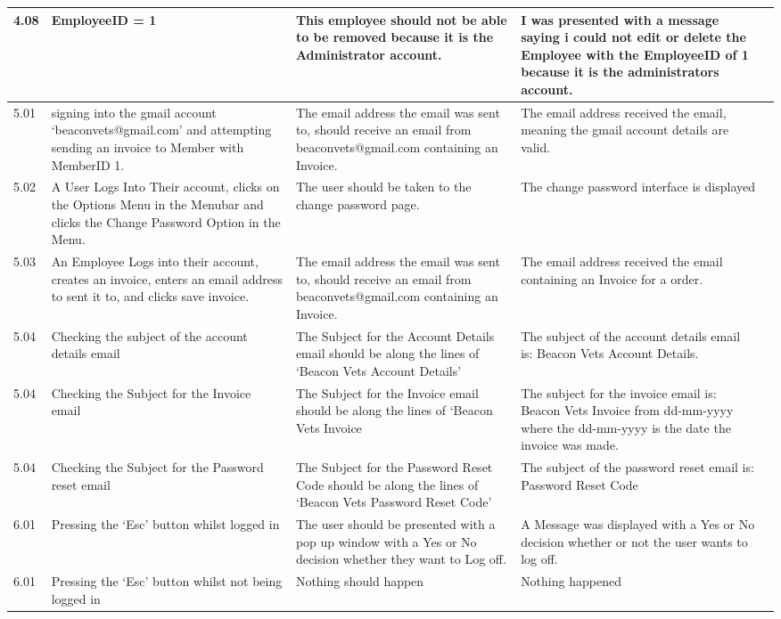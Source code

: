 \begin{flushleft}
\begin{longtable}{|p{1.0cm}|p{2.5cm}|p{3cm}|p{3.0cm}|p{2.5cm}|}
	4.08 &  EmployeeID = 1 & This employee should not be able to be removed because it is the Administrator account.& I was presented with a message saying i could not edit or delete the Employee with the EmployeeID of 1 because it is the administrators account. & \\ \hline
	5.01 &  signing into the gmail account `beaconvets@gmail.com' and attempting sending an invoice to Member with MemberID 1.  & The email address the email was sent to, should receive an email from beaconvets@gmail.com containing an Invoice. & The email address received the email, meaning the gmail account details are valid. & \\ \hline
	5.02 & A User Logs Into Their account, clicks on the Options Menu in the Menubar and clicks the Change Password Option in the Menu.& The user should be taken to the change password page. & The change password interface is displayed& \\ \hline
	5.03 & An Employee Logs into their account, creates an invoice, enters an email address to sent it to, and clicks save invoice. & The email address the email was sent to, should receive an email from beaconvets@gmail.com containing an Invoice. &  The email address received the email containing an Invoice for a order. & \\ \hline
	5.04 & Checking the subject of the account details email & The Subject for the Account Details email should be along the lines of  `Beacon Vets Account Details' & The subject of the account details email is: Beacon Vets Account Details. & \\ \hline
	5.04 & Checking the Subject for the Invoice email &  The Subject for the Invoice email should be along the lines of  `Beacon Vets Invoice &The subject for the invoice email is: Beacon Vets Invoice from dd-mm-yyyy where the dd-mm-yyyy is the date the invoice was made. & \\ \hline
	5.04 & Checking the Subject for the Password reset email &  The Subject for the Password Reset Code should be along the lines of  `Beacon Vets Password Reset Code' & The subject of the password reset email is: Password Reset Code & \\ \hline
	6.01 & Pressing the `Esc' button whilst logged in & The user should be presented with a pop up window with a Yes or No decision whether they want to Log off.& A Message was displayed with a Yes or No decision whether or not the user wants to log off. & \\ \hline
	6.01 & Pressing the `Esc' button whilst not being logged in &Nothing should happen & Nothing happened & \\ \hline

\end{longtable}
\end{flushleft}
